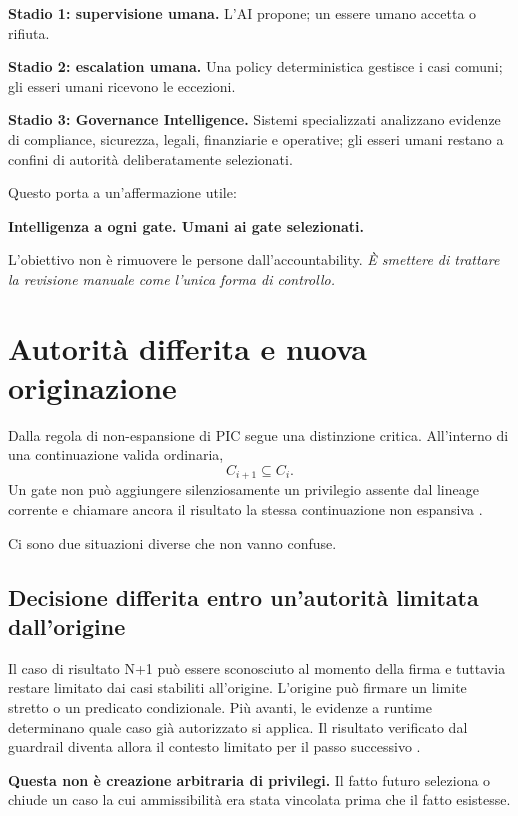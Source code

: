 \documentclass[10pt,oneside,openany]{book}
\begin{document}
\textbf{Stadio 1: supervisione umana.} L'AI propone; un essere umano accetta o rifiuta.

\textbf{Stadio 2: escalation umana.} Una policy deterministica gestisce i casi comuni; gli esseri umani ricevono le eccezioni.

\textbf{Stadio 3: Governance Intelligence.} Sistemi specializzati analizzano evidenze di compliance, sicurezza, legali, finanziarie e operative; gli esseri umani restano a confini di autorità deliberatamente selezionati.

Questo porta a un'affermazione utile:

\begin{center}
\sffamily\bfseries
Intelligenza a ogni gate. Umani ai gate selezionati.
\end{center}

L'obiettivo non è rimuovere le persone dall'accountability. \emph{È smettere di trattare la revisione manuale come l'unica forma di controllo.}

\chapter{Autorità differita e nuova originazione}

Dalla regola di non-espansione di PIC segue una distinzione critica. All'interno di una continuazione valida ordinaria,
\[
C_{i+1}\subseteq C_i.
\]
Un gate non può aggiungere silenziosamente un privilegio assente dal lineage corrente e chiamare ancora il risultato la stessa continuazione non espansiva \cite{gallo2026pic}.

Ci sono due situazioni diverse che non vanno confuse.

\section{Decisione differita entro un'autorità limitata dall'origine}
Il caso di risultato N+1 può essere sconosciuto al momento della firma e tuttavia restare limitato dai casi stabiliti all'origine. L'origine può firmare un limite stretto o un predicato condizionale. Più avanti, le evidenze a runtime determinano quale caso già autorizzato si applica. Il risultato verificato dal guardrail diventa allora il contesto limitato per il passo successivo \cite{picwhy}.

\textbf{Questa non è creazione arbitraria di privilegi.} Il fatto futuro seleziona o chiude un caso la cui ammissibilità era stata vincolata prima che il fatto esistesse.
\end{document}
